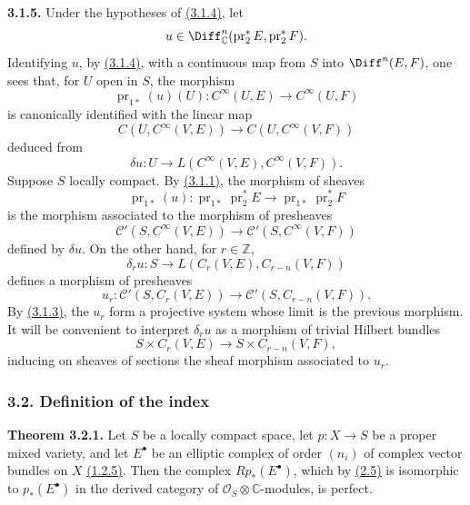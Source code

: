 \textbf{3.1.5.} Under the hypotheses of \hyperlink{sga6.e02.lem.3-1-4}{(3.1.4)}, let
\[
 u\in\Diff^n_{\mathbb C}(\operatorname{pr}_2^*E,\operatorname{pr}_2^*F).
\]
Identifying $u$, by \hyperlink{sga6.e02.lem.3-1-4}{(3.1.4)}, with a continuous map from $S$ into $\Diff^n(E,F)$, one sees that, for $U$ open in $S$, the morphism
\[
 \operatorname{pr}_{1*}(u)(U):C^\infty(U,E)\longrightarrow C^\infty(U,F)
\]
is canonically identified with the linear map
\[
 C(U,C^\infty(V,E))\longrightarrow C(U,C^\infty(V,F))
\]
deduced from
\[
 \delta u:U\longrightarrow L(C^\infty(V,E),C^\infty(V,F)).
\]
Suppose $S$ locally compact. By \hyperlink{sga6.e02.lem.3-1-1}{(3.1.1)}, the morphism of sheaves
\[
 \operatorname{pr}_{1*}(u):
 \operatorname{pr}_{1*}\operatorname{pr}_2^*E
 \longrightarrow
 \operatorname{pr}_{1*}\operatorname{pr}_2^*F
\]
is the morphism associated to the morphism of presheaves
\[
 \mathcal C'(S,C^\infty(V,E))\longrightarrow \mathcal C'(S,C^\infty(V,F))
\]
defined by $\delta u$. On the other hand, for $r\in\mathbb Z$,
\[
 \delta_r u:S\longrightarrow L(C_r(V,E),C_{r-n}(V,F))
\]
defines a morphism of presheaves
\[
 u_r:\mathcal C'(S,C_r(V,E))\longrightarrow \mathcal C'(S,C_{r-n}(V,F)).
\]
By \hyperlink{sga6.e02.para.3-1-3}{(3.1.3)}, the $u_r$ form a projective system whose limit is the previous morphism. It will be convenient to interpret $\delta_r u$ as a morphism of trivial Hilbert bundles
\[
 S\times C_r(V,E)\longrightarrow S\times C_{r-n}(V,F),
\]
inducing on sheaves of sections the sheaf morphism associated to $u_r$.

\subsubsection*{3.2. Definition of the index}

\textbf{Theorem 3.2.1.} Let $S$ be a locally compact space, let $p:X\to S$ be a proper mixed variety, and let $E^\bullet$ be an elliptic complex of order $(n_i)$ of complex vector bundles on $X$ \hyperlink{sga6.e02.para.1-2-5}{(1.2.5)}. Then the complex $Rp_*(E^\bullet)$, which by \hyperlink{sga6.e02.cor.2-5}{(2.5)} is isomorphic to $p_*(E^\bullet)$ in the derived category of $\mathcal O_S\otimes\mathbb C$-modules, is perfect.

